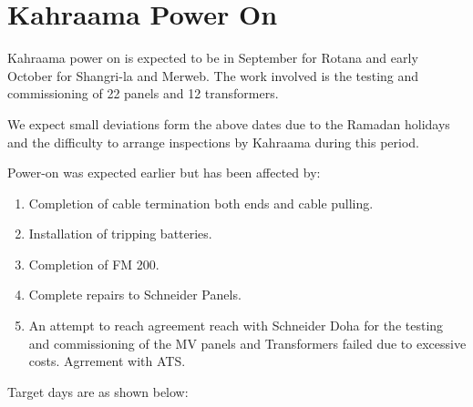 \chapter{Kahraama Power On}
 \label{ch:kahraama}

Kahraama power on is expected to be in September for Rotana and early October for Shangri-la and Merweb. The work involved is the testing and commissioning of 22 panels and 12  transformers.

We expect small deviations form the above dates due to the Ramadan holidays and the difficulty to arrange inspections by Kahraama during this period.

Power-on was expected earlier but has been affected by:

\begin{enumerate}
\item Completion of cable termination both ends and cable pulling. 
\item  Installation of tripping batteries.
\item  Completion of FM 200.
\item  Complete repairs to Schneider Panels.
\item  An attempt to reach agreement  reach with Schneider Doha for the testing and commissioning of the MV panels and Transformers failed due to excessive costs. Agrrement with ATS.
\end{enumerate}

Target days are as shown below:

